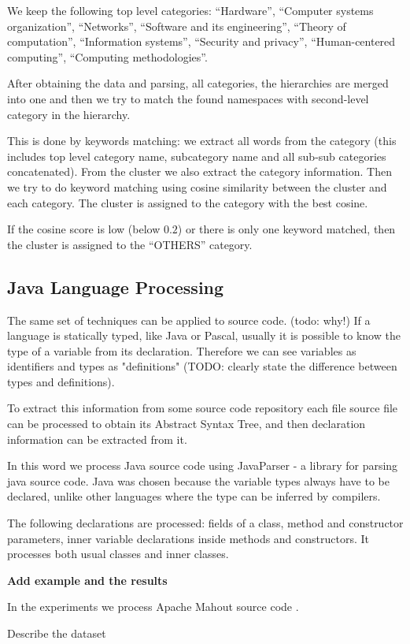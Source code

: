 We keep the following top level categories:
``Hardware'', ``Computer systems organization'', ``Networks'', 
``Software and its engineering'', ``Theory of computation'', 
``Information systems'', ``Security and privacy'',
``Human-centered computing'', ``Computing methodologies''.

After obtaining the data and parsing, all categories, the hierarchies 
are merged into one and then we try to match the found namespaces 
with second-level category in the hierarchy. 

This is done by keywords matching: we extract all words from the 
category (this includes top level category name, subcategory name
and all sub-sub categories concatenated). From the cluster 
we also extract the category information.
Then we try to do keyword matching using cosine similarity 
between the cluster and each category. The cluster is assigned 
to the category with the best cosine. 

If the cosine score is low (below $0.2$) or there is only one 
keyword matched, then the cluster is assigned to the ``OTHERS'' 
category.


\subsection{Java Language Processing}

The same set of techniques can be applied to source code.
(todo: why!)
If a language 
is statically typed, like Java or Pascal, usually it is possible to know the
type of a variable from its declaration. Therefore we can see 
variables as identifiers and types as "definitions" (TODO: clearly state 
the difference between types and definitions).

To extract this information from some source code repository each file source
file can be processed to obtain its Abstract Syntax Tree, and then 
declaration information can be extracted from it. 


In this word we process Java source code using JavaParser \cite{javaparser} - 
a library for parsing java source code. Java was chosen because the variable 
types always have to be declared, unlike other languages where the type 
can be inferred by compilers. 

The following declarations are processed: fields of a class, method and 
constructor parameters, inner variable declarations inside 
methods and constructors. It processes both usual classes and inner classes. 

\textbf{Add example and the results}


In the experiments we process Apache Mahout source code \cite{mahout}. 

Describe the dataset
